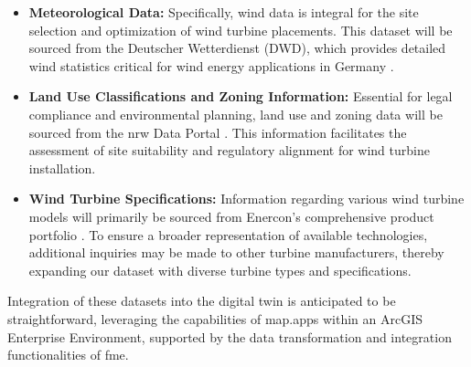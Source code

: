 \documentclass[11pt, titlepage, a4paper]{scrartcl}
\begin{document}
\begin{linenumbers}
\begin{itemize}
    \item \textbf{Meteorological Data:} Specifically, wind data is integral for the site selection and optimization of wind turbine placements. This dataset will be sourced from the Deutscher Wetterdienst (DWD), which provides detailed wind statistics critical for wind energy applications in Germany \cite{deutscherwetterdienstWinddatenFurWindenergienutzer}.

    \item \textbf{Land Use Classifications and Zoning Information:} Essential for legal compliance and environmental planning, land use and zoning data will be sourced from the \gls{nrw} Data Portal \cite{ministeriumfurheimatkommunalesbauunddigitalisierungdeslandesnordrhein-westfalenOpenNRW}. This information facilitates the assessment of site suitability and regulatory alignment for wind turbine installation.

    \item \textbf{Wind Turbine Specifications:} Information regarding various wind turbine models will primarily be sourced from Enercon’s comprehensive product portfolio \cite{enerconglobalgmbhENERCONWindenergieanlagenPortfolio}. To ensure a broader representation of available technologies, additional inquiries may be made to other turbine manufacturers, thereby expanding our dataset with diverse turbine types and specifications.
\end{itemize}

Integration of these datasets into the digital twin is anticipated to be straightforward, leveraging the capabilities of map.apps within an ArcGIS Enterprise Environment, supported by the data transformation and integration functionalities of \gls{fme}.





\end{linenumbers}
\end{document}
